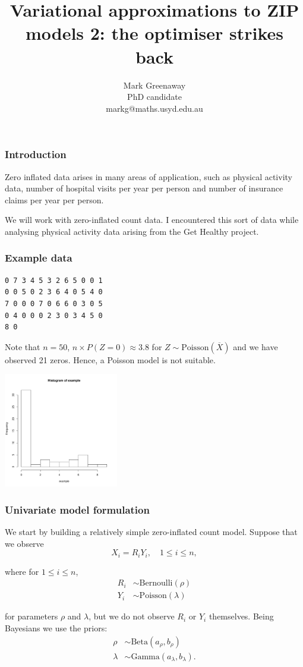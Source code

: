 \documentclass{beamer}
\title{Variational approximations to ZIP models 2: the optimiser strikes back}
\author{Mark Greenaway\\PhD candidate\\markg@maths.usyd.edu.au}
\begin{document}
\begin{frame}
\titlepage
\end{frame}

\begin{frame}
\frametitle{Introduction}
Zero inflated data arises in many areas of application, such as physical
activity data, number of hospital visits per year per person and
number of insurance claims per year per person.

\bigskip 
We will work with zero-inflated count data. I encountered this sort of data 
while analysing physical activity data arising from the Get Healthy project.
\end{frame}

\begin{frame}[fragile]
\frametitle{Example data}
\begin{verbatim}
0 7 3 4 5 3 2 6 5 0 0 1
0 0 5 0 2 3 6 4 0 5 4 0
7 0 0 0 7 0 6 6 0 3 0 5
0 4 0 0 0 2 3 0 3 4 5 0
8 0
\end{verbatim}

\noindent Note that $n=50$, 
$n\times P(Z = 0) \approx 3.8$ for $Z\sim\mbox{Poisson}(\overline{X})$
and we have observed 21 zeros. Hence,
a Poisson model is not suitable.

\includegraphics[width=50mm, height=50mm]{code/univariate_data_histogram.pdf}
\end{frame}

\begin{frame}
\frametitle{Univariate model formulation}

We start by building a relatively simple zero-inflated count model. Suppose that we observe
$$
X_i = R_i Y_i, \quad 1\le i\le n,
$$

\noindent where for $1\le i\le n$,
\begin{align*} 
R_i &\sim \text{Bernoulli}(\rho) \\
Y_i &\sim \text{Poisson}(\lambda)
\end{align*}

\noindent for parameters $\rho$ and $\lambda$,
but we do not observe $R_i$ or $Y_i$ themselves.
Being Bayesians we use the priors:
\begin{align*} 
\rho &\sim \text{Beta}(a_\rho, b_\rho) \\
\lambda &\sim \text{Gamma}(a_\lambda, b_\lambda).
\end{align*}

\end{frame}
\end{document}
